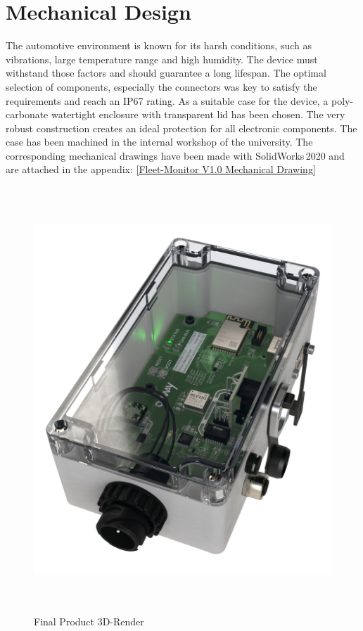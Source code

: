 \section{Mechanical Design}
The automotive environment is known for its harsh conditions, such as vibrations, large temperature range and high humidity. The device must withstand those factors and should guarantee a long lifespan. The optimal selection of components, especially the connectors was key to satisfy the requirements and reach an IP67 rating.\newline
As a suitable case for the device, a poly-carbonate watertight enclosure with transparent lid has been chosen. The very robust construction creates an ideal protection for all electronic components.\newline
The case has been machined in the internal workshop of the university. The corresponding mechanical drawings have been made with SolidWorks\,2020 and are attached in the appendix: \ref{Fleet-Monitor V1.0 Mechanical Drawing}

\medskip
\begin{figure}[h!]
	\centering
	\includegraphics[height=16cm]{images/fleet-monitor-rendering}
	\caption{Final Product 3D-Render}
	\label{fig:fleet-monitor-rendering}
\end{figure}
\newpage


